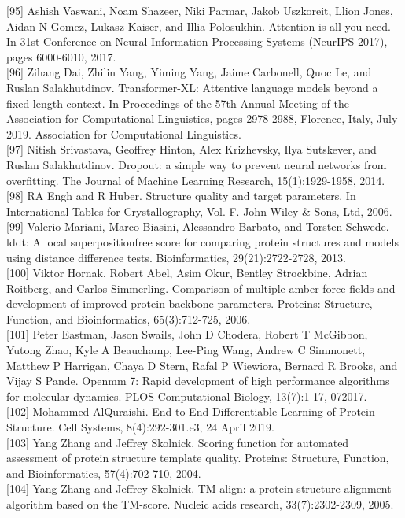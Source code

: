 \documentclass[10pt]{article}
\begin{document}
[95] Ashish Vaswani, Noam Shazeer, Niki Parmar, Jakob Uszkoreit, Llion Jones, Aidan N Gomez, Lukasz Kaiser, and Illia Polosukhin. Attention is all you need. In 31st Conference on Neural Information Processing Systems (NeurIPS 2017), pages 6000-6010, 2017.\\[0pt]
[96] Zihang Dai, Zhilin Yang, Yiming Yang, Jaime Carbonell, Quoc Le, and Ruslan Salakhutdinov. Transformer-XL: Attentive language models beyond a fixed-length context. In Proceedings of the 57th Annual Meeting of the Association for Computational Linguistics, pages 2978-2988, Florence, Italy, July 2019. Association for Computational Linguistics.\\[0pt]
[97] Nitish Srivastava, Geoffrey Hinton, Alex Krizhevsky, Ilya Sutskever, and Ruslan Salakhutdinov. Dropout: a simple way to prevent neural networks from overfitting. The Journal of Machine Learning Research, 15(1):1929-1958, 2014.\\[0pt]
[98] RA Engh and R Huber. Structure quality and target parameters. In International Tables for Crystallography, Vol. F. John Wiley \& Sons, Ltd, 2006.\\[0pt]
[99] Valerio Mariani, Marco Biasini, Alessandro Barbato, and Torsten Schwede. lddt: A local superpositionfree score for comparing protein structures and models using distance difference tests. Bioinformatics, 29(21):2722-2728, 2013.\\[0pt]
[100] Viktor Hornak, Robert Abel, Asim Okur, Bentley Strockbine, Adrian Roitberg, and Carlos Simmerling. Comparison of multiple amber force fields and development of improved protein backbone parameters. Proteins: Structure, Function, and Bioinformatics, 65(3):712-725, 2006.\\[0pt]
[101] Peter Eastman, Jason Swails, John D Chodera, Robert T McGibbon, Yutong Zhao, Kyle A Beauchamp, Lee-Ping Wang, Andrew C Simmonett, Matthew P Harrigan, Chaya D Stern, Rafal P Wiewiora, Bernard R Brooks, and Vijay S Pande. Openmm 7: Rapid development of high performance algorithms for molecular dynamics. PLOS Computational Biology, 13(7):1-17, 072017.\\[0pt]
[102] Mohammed AlQuraishi. End-to-End Differentiable Learning of Protein Structure. Cell Systems, 8(4):292-301.e3, 24 April 2019.\\[0pt]
[103] Yang Zhang and Jeffrey Skolnick. Scoring function for automated assessment of protein structure template quality. Proteins: Structure, Function, and Bioinformatics, 57(4):702-710, 2004.\\[0pt]
[104] Yang Zhang and Jeffrey Skolnick. TM-align: a protein structure alignment algorithm based on the TM-score. Nucleic acids research, 33(7):2302-2309, 2005.\\[0pt]
\end{document}

